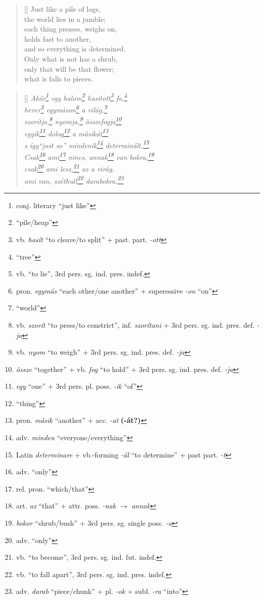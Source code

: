 \documentclass[a4paper,12pt,twoside,final]{book}
\begin{document}
\begin{verse}[\versewidth]
  Just like a pile of logs, \\
  the world lies in a jumble; \\
  each thing presses, weighs on, \\
  holds fast to another, \\
  and so everything is determined. \\
  Only what is not has a shrub, \\
  only that will be that flower; \\
  what is falls to pieces.
\end{verse}


\newpage

\settowidth{\versewidth}{Csak ami nincs, annak van bokra,}

\begin{verse}[\versewidth]
  \it
  Akár\footnote{conj. literary ``just like''} egy
  halom\footnote{``pile/heap''} hasított\footnote{vb.
  \emph{hasít} ``to cleave/to split'' +
  past. part. \emph{-ott} } fa,\footnote{``tree''} \\
  hever\footnote{vb. ``to lie'', 3rd pers. sg. ind. pres. indef.}
  egymáson\footnote{pron. \emph{egymás} ``each other/one
  another'' + superessive \emph{-on} ``on''} a világ,\footnote{``world''} \\
  szorítja,\footnote{vb. \emph{szorít} ``to press/to
  constrict'', inf. \emph{szorítani} + 3rd
  pers. sg. ind. pres. def. \emph{-ja}} nyomja,\footnote{vb.
  \emph{nyom} ``to weigh'' + 3rd pers. sg. ind. pres. def. \emph{-ja}}
  összefogja\footnote{\emph{össze} ``together'' + vb. \emph{fog}
  ``to hold'' + 3rd pers. sg. ind. pres. def. \emph{-ja}} \\
  egyik\footnote{\emph{egy} ``one'' + 3rd
  pers. pl. poss. \emph{-ik} ``of'' } dolog\footnote{``thing''} a
  másikát\footnote{pron. \emph{másik} ``another'' +
  acc. \emph{-at} \textbf{(-át?)}} \\
  s így\emph{``just so''} mindenik\footnote{adv. \emph{minden}
  ``everyone/everything''} determinált.\footnote{Latin \emph{determinare} +
  vb.-forming \emph{-ál} ``to determine'' + past part. \emph{-t}} \\
  Csak\footnote{adv. ``only''} ami\footnote{rel. pron. ``which/that''} nincs,
  annak\footnote{art. \emph{az} ``that'' + attr. poss. \emph{-nak}
  $\rightarrow$ \emph{annak}}
  van bokra,\footnote{\emph{bokor} ``shrub/bush'' + 3rd
  pers. sg. single poss. \emph{-a}} \\
  csak\footnote{adv. ``only''} ami lesz,\footnote{vb. ``to
  become'', 3rd pers. sg. ind. fut. indef.} az a virág, \\
  ami van, széthull\footnote{vb. ``to fall apart'',
  3rd pers. sg. ind. pres. indef.}
  darabokra.\footnote{adv. \emph{darab} ``piece/chunk'' +
  pl. \emph{-ok} + subl. \emph{-ra} ``into''}
\end{verse}
\end{document}
